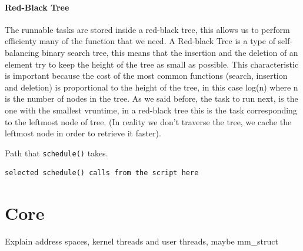 \documentclass[10pt, oneside]{book}
\begin{document}
\paragraph{Red-Black Tree}
The runnable tasks are stored inside a red-black tree, this allows us to perform efficienty many of the function that we need.
A Red-black Tree is a type of self-balancing binary search tree, this means that the insertion and the deletion of an element try to keep the height of the tree as small as possible. This characteristic is important because the cost of the most common functions (search, insertion and deletion) is proportional to the height of the tree, in this case log(n) where n is the number of nodes in the tree.
As we said before, the task to run next, is the one with the smallest vruntime, in a red-black tree this is the task corresponding to the leftmost node of tree. (In reality we don't traverse the tree, we cache the leftmost node in order to retrieve it faster).

Path that \verb|schedule()| takes.

\begin{Verbatim}
selected schedule() calls from the script here
\end{Verbatim}

\section{Core} 
\label{sec:core}
Explain address spaces, kernel threads and user threads, maybe mm\_struct
\end{document}
